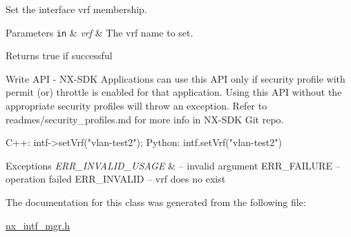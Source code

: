 Set the interface vrf membership. 
\begin{DoxyParams}[1]{Parameters}
\mbox{\tt in}  & {\em vrf} & The vrf name to set. \\
\hline
\end{DoxyParams}
\begin{DoxyReturn}{Returns}
true if successful
\end{DoxyReturn}
\begin{DoxyVerb}Write API - NX-SDK Applications can use this API only if security profile with permit (or) throttle is 
            enabled for that application. Using this API without the appropriate security profiles will
            throw an exception. Refer to readmes/security_profiles.md for more info in NX-SDK Git repo.
\end{DoxyVerb}



\begin{DoxyCode}
C++:
   intf->setVrf(\textcolor{stringliteral}{"vlan-test2"});
Python:
   intf.setVrf(\textcolor{stringliteral}{"vlan-test2"})
\end{DoxyCode}



\begin{DoxyExceptions}{Exceptions}
{\em E\+R\+R\+\_\+\+I\+N\+V\+A\+L\+I\+D\+\_\+\+U\+S\+A\+GE} & -- invalid argument E\+R\+R\+\_\+\+F\+A\+I\+L\+U\+RE -- operation failed E\+R\+R\+\_\+\+I\+N\+V\+A\+L\+ID -- vrf does no exist \\
\hline
\end{DoxyExceptions}


The documentation for this class was generated from the following file\+:\begin{DoxyCompactItemize}
\item 
\mbox{\hyperlink{nx__intf__mgr_8h}{nx\+\_\+intf\+\_\+mgr.\+h}}\end{DoxyCompactItemize}
